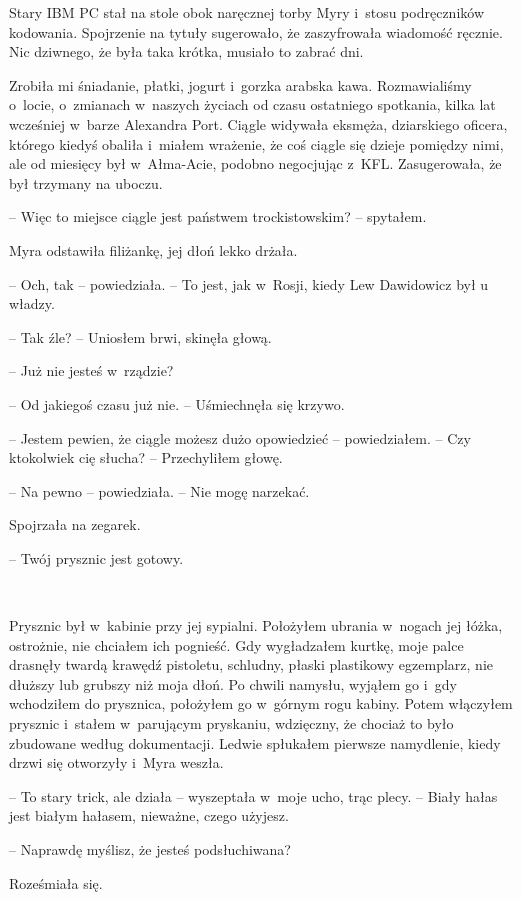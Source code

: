 \documentclass[oneside,polish,11pt,sfheadings]{mwbk}
\begin{document}
Stary IBM PC stał na stole obok naręcznej torby Myry i~stosu
podręczników kodowania. Spojrzenie na tytuły sugerowało, że zaszyfrowała
wiadomość ręcznie. Nic dziwnego, że była taka krótka, musiało to zabrać
dni.

Zrobiła mi śniadanie, płatki, jogurt i~gorzka arabska kawa.
Rozmawialiśmy o~locie, o~zmianach w~naszych życiach od czasu ostatniego
spotkania, kilka lat wcześniej w~barze Alexandra Port. Ciągle widywała
eksmęża, dziarskiego oficera, którego kiedyś obaliła i~miałem wrażenie,
że coś ciągle się dzieje pomiędzy nimi, ale od miesięcy był w~Ałma-Acie,
podobno negocjując z~KFL. Zasugerowała, że był trzymany na uboczu.

-- Więc to miejsce ciągle jest państwem trockistowskim? -- spytałem.

Myra odstawiła filiżankę, jej dłoń lekko drżała.

-- Och, tak -- powiedziała. -- To jest, jak w~Rosji, kiedy Lew Dawidowicz
był u władzy.

-- Tak źle? -- Uniosłem brwi, skinęła głową.

-- Już nie jesteś w~rządzie?

-- Od jakiegoś czasu już nie. -- Uśmiechnęła się krzywo.

-- Jestem pewien, że ciągle możesz dużo opowiedzieć -- powiedziałem. -- Czy
ktokolwiek cię słucha? -- Przechyliłem głowę.

-- Na pewno -- powiedziała. -- Nie mogę narzekać.

Spojrzała na zegarek. 

-- Twój prysznic jest gotowy.

~

Prysznic był w~kabinie przy jej sypialni. Położyłem ubrania w~nogach jej
łóżka, ostrożnie, nie chciałem ich pognieść. Gdy wygładzałem kurtkę,
moje palce drasnęły twardą krawędź pistoletu, schludny, płaski
plastikowy egzemplarz, nie dłuższy lub grubszy niż moja dłoń. Po chwili
namysłu, wyjąłem go i~gdy wchodziłem do prysznica, położyłem go w~górnym
rogu kabiny. Potem włączyłem prysznic i~stałem w~parującym pryskaniu,
wdzięczny, że chociaż to było zbudowane według dokumentacji. Ledwie
spłukałem pierwsze namydlenie, kiedy drzwi się otworzyły i~Myra weszła.

-- To stary trick, ale działa -- wyszeptała w~moje ucho, trąc plecy. -- Biały hałas jest białym hałasem, nieważne, czego użyjesz.

-- Naprawdę myślisz, że jesteś podsłuchiwana?

Roześmiała się. 
\end{document}
